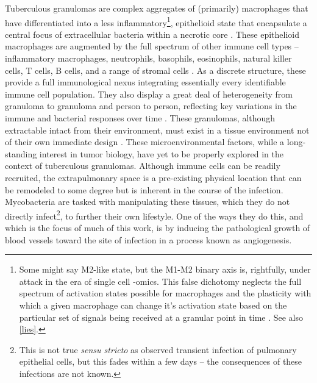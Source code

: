 Tuberculous granulomas are complex aggregates of (primarily) macrophages that have differentiated into a less inflammatory\footnote{Some might say M2\hyp{}like state, but the M1\hyp{}M2 binary axis is, rightfully, under attack in the era of single cell \hyp{}omics. This false dichotomy neglects the full spectrum of activation states possible for macrophages and the plasticity with which a given macrophage can change it's activation state based on the particular set of signals being received at a granular point in time \citep{Martinez2014, Ley2017}. See also \autoref{lies}.}, epithelioid state that encapsulate a central focus of extracellular bacteria within a necrotic core \citep{Boros2003, Rubin2009, Cronan2016}. These epithelioid macrophages are augmented by the full spectrum of other immune cell types -- inflammatory macrophages, neutrophils, basophils, eosinophils, natural killer cells, T cells, B cells, and a range of stromal cells \citep{Russell2007, Ramakrishnan2012}. As a discrete structure, these provide a full immunological nexus integrating essentially every identifiable immune cell population. They also display a great deal of heterogeneity from granuloma to granuloma and person to person, reflecting key variations in the immune and bacterial responses over time \citep{Cadena2017, Gideon2022}. These granulomas, although extractable intact from their environment, must exist in a tissue environment not of their own immediate design \citep{Datta2015, Kaplan2003, McCaffrey2022, Cronan2018}. These microenvironmental factors, while a long\hyp{}standing interest in tumor biology, have yet to be properly explored in the context of tuberculous granulomas. Although immune cells can be readily recruited, the extrapulmonary space is a pre\hyp{}existing physical location that can be remodeled to some degree but is inherent in the course of the infection. Mycobacteria are tasked with manipulating these tissues, which they do not directly infect\footnote{This is not true \textit{sensu stricto} as \citet{Cohen2018} observed transient infection of pulmonary epithelial cells, but this fades within a few days -- the consequences of these infections are not known.}, to further their own lifestyle. One of the ways they do this, and which is the focus of much of this work, is by inducing the pathological growth of blood vessels toward the site of infection in a process known as angiogenesis.

